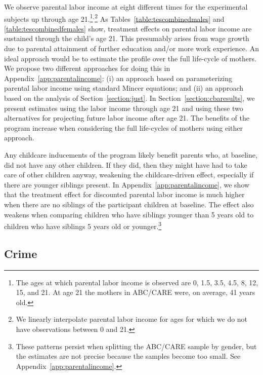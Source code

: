 We observe parental labor income at eight different times for the experimental subjects up through age 21.\footnote{The ages at which parental labor income is observed are 0, 1.5, 3.5, 4.5, 8, 12, 15, and 21. At age 21 the mothers in ABC/CARE were, on average, 41 years old.}$^,$\footnote{We linearly interpolate parental labor income for ages for which we do not have observations between 0 and 21.} As Tables~\ref{table:tescombinedmales} and \ref{table:tescombinedfemales} show, treatment effects on parental labor income are sustained through the child's age 21. This presumably arises from wage growth due to parental attainment of further education and/or more work experience. An ideal approach would be to estimate the profile over the full life-cycle of mothers. We propose two different approaches for doing this in Appendix~\ref{app:parentalincome}: (i) an approach based on parameterizing parental labor income using standard Mincer equations; and (ii) an approach based on the analysis of Section~\ref{section:just}. In Section~\ref{section:cbaresults}, we present estimates using the labor income through age 21 and using these two alternatives for projecting future labor income after age 21. The benefits of the program increase when considering the full life-cycles of mothers using either approach.

Any childcare inducements of the program likely benefit parents who, at baseline, did not have any other children. If they did, then they might have had to take care of other children anyway, weakening the childcare-driven effect, especially if there are younger siblings present. In Appendix~\ref{app:parentalincome}, we show that the treatment effect for discounted parental labor income is much higher when there are no siblings of the participant children at baseline. The effect also weakens when comparing children who have siblings younger than 5 years old to children who have siblings 5 years old or younger.\footnote{These patterns persist when splitting the ABC/CARE sample by gender, but the estimates are not precise because the samples become too small. See Appendix~\ref{app:parentalincome}.}

\subsection{Crime}\label{sec:crime}

